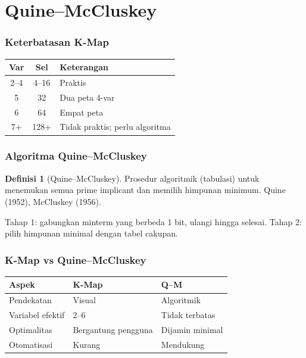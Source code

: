 \documentclass[handout]{beamer}
\theoremstyle{definition}
\newtheorem{definisi}[theorem]{Definisi}
\theoremstyle{example}
\begin{document}
\section{Quine--McCluskey}

\begin{frame}
\frametitle{Keterbatasan K-Map}
\begin{center}
\small
\begin{tabular}{|c|c|l|}
\hline
\textbf{Var} & \textbf{Sel} & \textbf{Keterangan} \\ \hline
2--4 & 4--16 & Praktis \\ \hline
5 & 32 & Dua peta 4-var \\ \hline
6 & 64 & Empat peta \\ \hline
7+ & 128+ & Tidak praktis; perlu algoritma \\ \hline
\end{tabular}
\end{center}
\end{frame}

\begin{frame}
\frametitle{Algoritma Quine--McCluskey}
\begin{definisi}[Quine--McCluskey]
Prosedur algoritmik (tabulasi) untuk menemukan semua prime implicant dan memilih himpunan minimum. Quine (1952), McCluskey (1956).
\end{definisi}
Tahap 1: gabungkan minterm yang berbeda 1 bit, ulangi hingga selesai. Tahap 2: pilih himpunan minimal dengan tabel cakupan.
\end{frame}

\begin{frame}
\frametitle{K-Map vs Quine--McCluskey}
\begin{center}
\small
\begin{tabular}{|l|l|l|}
\hline
\textbf{Aspek} & \textbf{K-Map} & \textbf{Q--M} \\ \hline
Pendekatan & Visual & Algoritmik \\ \hline
Variabel efektif & 2--6 & Tidak terbatas \\ \hline
Optimalitas & Bergantung pengguna & Dijamin minimal \\ \hline
Otomatisasi & Kurang & Mendukung \\ \hline
\end{tabular}
\end{center}
\end{frame}
\end{document}

